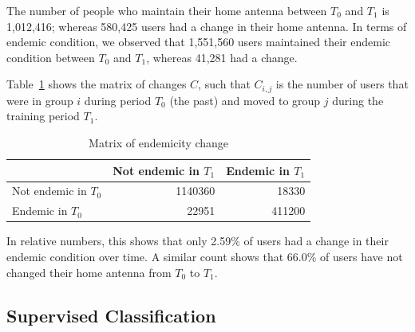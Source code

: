 The number of people who maintain their home antenna between $T_0$ and $T_1$ is 1,012,416;
whereas 580,425 users had a change in their home antenna.
In terms of endemic condition, we observed that 1,551,560 users maintained their endemic condition
between $T_0$ and $T_1$, whereas 41,281 had a change.



%
%
%

Table~\ref{tab:changes} 
shows the matrix of changes $C$, such that $C_{i, j}$ is the number of users that were in group $i$ during period $T_0$ (the past) and moved to group $j$ during the training period $T_1$. 

\begin{table}[ht]
\caption{Matrix of endemicity change}
\label{tab:changes}
\centering
\begin{tabular}{l r r }
\toprule
				& Not endemic in $T_1$ & Endemic in $T_1$ \\
\midrule
Not endemic in $T_0$ & 1140360 & 18330  \\
Endemic in $T_0$     & 22951   & 411200 \\
\bottomrule
\end{tabular}
\end{table}

In relative numbers, this shows that only 2.59\% of users had a change in their endemic condition over time. A similar count shows that 66.0\% of users have not changed their home antenna from $T_0$ to $T_1$.


\subsection{Supervised Classification}


